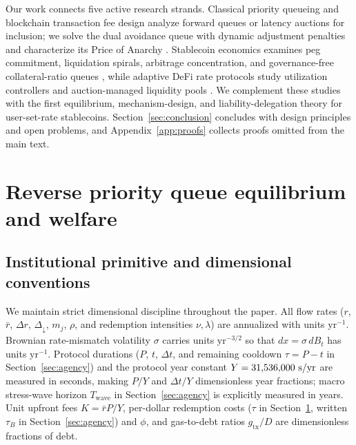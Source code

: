 Our work connects five active research strands. Classical priority queueing \citep{kleinrock1967optimum,lui1985equilibrium,afeche2004pricing} and blockchain transaction fee design \citep{huberman2021monopoly,ganesh2024revisiting,bahrani2024tfm,babaioff2025welfare,capponi2026auctioning} analyze forward queues or latency auctions for inclusion; we solve the dual avoidance queue with dynamic adjustment penalties and characterize its Price of Anarchy \citep{roughgarden2017poa}. Stablecoin economics examines peg commitment, liquidation spirals, arbitrage concentration, and governance-free collateral-ratio queues \citep{klagesmundt2022while,ma2025stablecoin,davernas2026can,genc2026a,genc2026b}, while adaptive DeFi rate protocols study utilization controllers and auction-managed liquidity pools \citep{bastankhah2024thinking,adams2025amamm}. We complement these studies with the first equilibrium, mechanism-design, and liability-delegation theory for user-set-rate stablecoins. Section~\ref{sec:conclusion} concludes with design principles and open problems, and Appendix~\ref{app:proofs} collects proofs omitted from the main text.

\section{Reverse priority queue equilibrium and welfare}\label{sec:queue}

\subsection{Institutional primitive and dimensional conventions}\label{subsec:queue_model}

We maintain strict dimensional discipline throughout the paper. All flow rates ($r$, $\bar{r}$, $\Delta r$, $\Delta_\downarrow$, $m_j$, $\rho$, and redemption intensities $\nu, \lambda$) are annualized with units $\mathrm{yr}^{-1}$. Brownian rate-mismatch volatility $\sigma$ carries units $\mathrm{yr}^{-3/2}$ so that $dx = \sigma\,dB_t$ has units $\mathrm{yr}^{-1}$. Protocol durations ($P$, $t$, $\Delta t$, and remaining cooldown $\tau = P - t$ in Section~\ref{sec:agency}) and the protocol year constant $Y = 31{,}536{,}000\textup{ s/yr}$ are measured in seconds, making $P/Y$ and $\Delta t/Y$ dimensionless year fractions; macro stress-wave horizon $T_{\mathrm{wave}}$ in Section~\ref{sec:agency} is explicitly measured in years. Unit upfront fees $K = \bar{r}P/Y$, per-dollar redemption costs ($\tau$ in Section~\ref{sec:queue}, written $\tau_B$ in Section~\ref{sec:agency}) and $\phi$, and gas-to-debt ratios $g_{\mathrm{tx}}/D$ are dimensionless fractions of debt.

